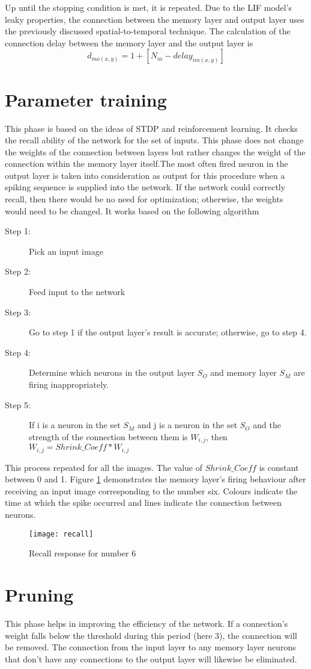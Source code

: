 Up until the stopping condition is met, it is repeated. Due to the LIF model's
leaky properties, the connection between the memory layer and output layer uses
the previously discussed spatial-to-temporal technique. The calculation of the
connection delay between the memory layer and the output layer is
\begin{equation*}
    d_{mo(x,y)}=1+[N_m-delay_{im(x,y)}]
\end{equation*}
\section{Parameter training}
This phase is based on the ideas of STDP and reinforcement learning. It checks
the recall ability of the network for the set of inputs. This phase does not
change the weights of the connection between layers but rather changes the
weight of the connection within the memory layer itself.The most often fired
neuron in the output layer is taken into consideration as output for this
procedure when a spiking sequence is supplied into the network. If the network
could correctly recall, then there would be no need for optimization;
otherwise, the weights would need to be changed. It works based on the
following algorithm
\begin{description}
    \item[Step 1:] Pick an input image
    \item[Step 2:] Feed input to the network
    \item[Step 3:] Go to step 1 if the output layer's result is accurate; otherwise, go
        to step 4.
    \item[Step 4:] Determine which neurons in the output layer $S_{O}$ and memory layer
        $S_{M}$ are firing inappropriately.
    \item[Step 5:] If i is a neuron in the set $S_M$ and j is a neuron in the set $S_O$
        and the strength of the connection between them is $W_{i,j}$, then
        $W_{i,j}=Shrink\_Coeff*W_{i,j}$
\end{description}This process repeated for all
the images. The value of $Shrink\_Coeff$ is constant between 0 and
1. Figure \ref{recall} demonstrates the memory layer's firing behaviour after receiving an input image corresponding to the number six. Colours indicate
the time at which the spike occurred and lines indicate the connection between
neurons.
\begin{figure}[h!]
    \centering
    \texttt{[image: recall]}
    \caption{Recall response for number 6}\label{recall}
\end{figure}
\section{Pruning}
This phase helps in improving the efficiency of the network. If a connection's
weight falls below the threshold during this period (here 3), the connection
will be removed. The connection from the input layer to any memory layer
neurons that don't have any connections to the output layer will likewise be
eliminated.
